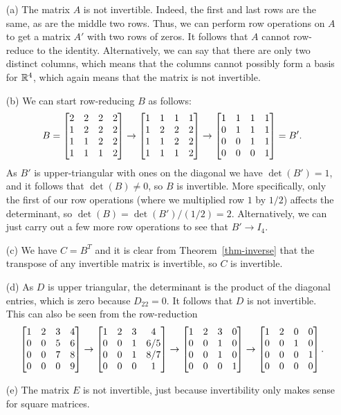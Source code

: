 \documentclass[a4paper]{amsart}
\renewenvironment{solution}{\SolutionInline}{\endSolutionInline}
\begin{document}
\begin{solution}
 \begin{itemize}
  \item[(a)] The matrix $A$ is not invertible.  Indeed, the first and
   last rows are the same, as are the middle two rows.  Thus, we can
   perform row operations on $A$ to get a matrix $A'$ with two rows of
   zeros.  It follows that $A$ cannot row-reduce to the identity.
   Alternatively, we can say that there are only two distinct columns,
   which means that the columns cannot possibly form a basis for
   ${\mathbb{R}}^4$, which again means that the matrix is not invertible.
  \item[(b)] We can start row-reducing $B$ as follows:
   \[ B = 
       \left[\begin{matrix} 2&2&2&2 \\ 1&2&2&2 \\ 1&1&2&2 \\ 1&1&1&2 \end{matrix}\right] \to
       \left[\begin{matrix} 1&1&1&1 \\ 1&2&2&2 \\ 1&1&2&2 \\ 1&1&1&2 \end{matrix}\right] \to
       \left[\begin{matrix} 1&1&1&1 \\ 0&1&1&1 \\ 0&0&1&1 \\ 0&0&0&1 \end{matrix}\right] = B'.
   \]
   As $B'$ is upper-triangular with ones on the diagonal we have
   $\det(B')=1$, and it follows that $\det(B)\neq 0$, so $B$ is
   invertible.  More specifically, only the first of our row
   operations (where we multiplied row $1$ by $1/2$) affects the
   determinant, so $\det(B)=\det(B')/(1/2)=2$.  Alternatively, we can
   just carry out a few more row operations to see that $B'\to I_4$.
  \item[(c)] We have $C=B^T$ and it is clear from
   Theorem~\ref{thm-inverse} that the transpose of any invertible
   matrix is invertible, so $C$ is invertible.
  \item[(d)] As $D$ is upper triangular, the determinant is the
   product of the diagonal entries, which is zero because $D_{22}=0$.
   It follows that $D$ is not invertible.  This can also be seen from
   the row-reduction
   \[ 
      \left[\begin{matrix} 1&2&3&4 \\ 0&0&5&6 \\ 0&0&7&8 \\ 0&0&0&9 \end{matrix}\right] \to
      \left[\begin{matrix} 1&2&3&4 \\ 0&0&1&6/5 \\ 0&0&1&8/7 \\ 0&0&0&1 \end{matrix}\right] \to
      \left[\begin{matrix} 1&2&3&0 \\ 0&0&1&0 \\ 0&0&1&0 \\ 0&0&0&1 \end{matrix}\right] \to
      \left[\begin{matrix} 1&2&0&0 \\ 0&0&1&0 \\ 0&0&0&1 \\ 0&0&0&0 \end{matrix}\right].
   \]
  \item[(e)] The matrix $E$ is not invertible, just because
   invertibility only makes sense for square matrices.
 \end{itemize}
\end{solution}
\end{document}
